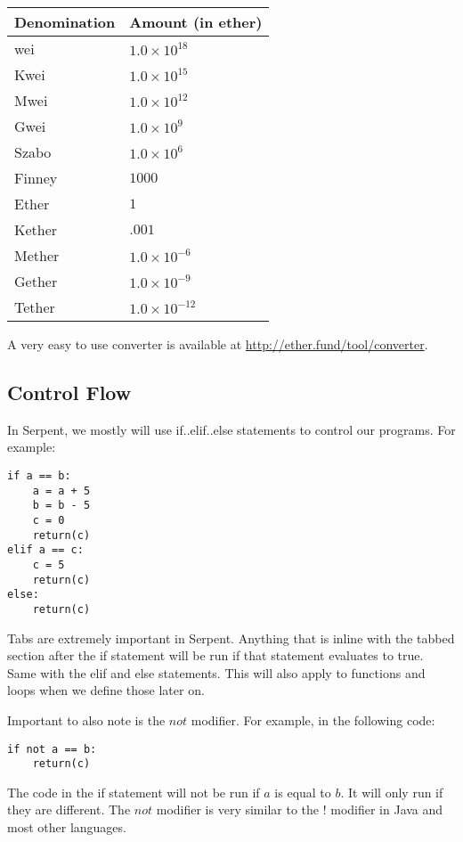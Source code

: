 \documentclass[12pt]{article}
\begin{document}
\begin{center}
	\begin{tabular}{| l | p{3.5cm} |}
	\hline
	Denomination & Amount (in ether) \\ \hline
	wei & $1.0 \times 10^{18}$ \\ \hline
	Kwei & $1.0 \times 10^{15}$ \\ \hline
	Mwei & $1.0 \times 10^{12}$ \\ \hline
	Gwei & $1.0 \times 10^{9}$ \\ \hline
	Szabo & $1.0 \times 10^{6}$ \\ \hline
	Finney & $1000$ \\ \hline
	Ether & $1$ \\ \hline
	Kether & $.001$ \\ \hline
	Mether & $1.0 \times 10^{-6}$ \\ \hline
	Gether & $1.0 \times 10^{-9}$ \\ \hline
	Tether & $1.0 \times 10^{-12}$ \\ \hline
	\end{tabular}
\end{center}

A very easy to use converter is available at \url{http://ether.fund/tool/converter}. 

\subsection{Control Flow}

	In Serpent, we mostly will use if..elif..else statements to control our programs. For example:
	
\begin{verbatim}
if a == b:
	a = a + 5
	b = b - 5
	c = 0
	return(c)
elif a == c: 
	c = 5
	return(c)
else:
	return(c)
\end{verbatim}

	Tabs are extremely important in Serpent. Anything that is inline with the tabbed section after the if statement will be run if that statement evaluates to true. Same with the elif and else statements. This will also apply to functions and loops when we define those later on. \cite{Serpent}
	
	Important to also note is the $not$ modifier. For example, in the following code:
	
\begin{verbatim}
if not a == b:
	return(c)
\end{verbatim}

The code in the if statement will not be run if $a$ is equal to $b$. It will only run if they are different. The $not$ modifier is very similar to the $!$ modifier in Java and most other languages. \cite{Serpent}
	
\end{document}
